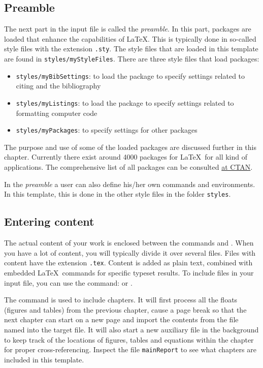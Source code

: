 \subsection{Preamble}
The next part in the input file is called the \textit{preamble}. In this part, packages are loaded that enhance the capabilities of \LaTeX. This is typically done in so-called style files with the extension \texttt{.sty}. The style files that are loaded in this template are found in \texttt{styles/myStyleFiles}. There are three style files that load packages:
\begin{itemize}
    \item \texttt{styles/myBibSettings}: to load the  package to specify settings related to citing and the bibliography
    \item \texttt{styles/myListings}: to load the   package to specify settings related to formatting computer code
    \item \texttt{styles/myPackages}: to specify settings for other packages
\end{itemize}

The purpose and use of some of the loaded packages are discussed further in this chapter. Currently there exist around 4000 packages for \LaTeX\ for all kind of applications. The comprehensive list of all packages can be consulted \href{https://www.ctan.org/pkg/}{at CTAN}.

In the \textit{preamble} a user can also define his/her own commands and environments. In this template, this is done in the other style files in the folder \texttt{styles}.

\subsection{Entering content}
The actual content of your work is enclosed between the commands  and . When you have a lot of content, you will typically divide it over several files. Files with content have the extension \texttt{.tex}. Content is added as plain text, combined with embedded \LaTeX\ commands for specific typeset results. To include files in your input file, you can use the command:   or .

The command  is used to include chapters. It will first process all the floats (figures and tables) from the previous chapter, cause a page break so that the next chapter can start on a new page and import the contents from the file named  into the target file. It will also start a new auxiliary file in the background to keep track of the locations of figures, tables and equations within the chapter for proper cross-referencing. Inspect the file \texttt{mainReport} to see what chapters are included in this template. 

